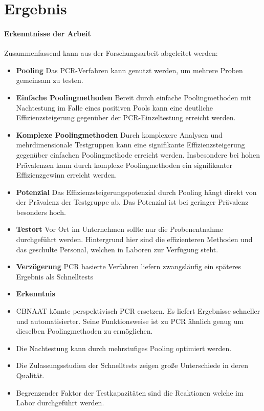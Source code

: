 \chapter{Ergebnis}
\subsubsection{Erkenntnisse der Arbeit}
Zusammenfassend kann aus der Forschungsarbeit abgeleitet werden:

\begin{itemize}
	\item \textbf{Pooling} Das PCR-Verfahren kann genutzt werden, um mehrere Proben gemeinsam zu testen.
	\item \textbf{Einfache Poolingmethoden} Bereit durch einfache Poolingmethoden mit Nachtestung im Falle eines positiven Pools kann eine deutliche Effizienzsteigerung gegenüber der PCR-Einzeltestung erreicht werden.
	\item \textbf{Komplexe Poolingmethoden} Durch komplexere Analysen und mehrdimensionale Testgruppen kann eine signifikante Effizienzsteigerung gegenüber einfachen Poolingmethode erreicht werden. Insbesondere bei hohen Prävalenzen kann durch komplexe Poolingmethoden ein signifikanter Effizienzgewinn erreicht werden.
	\item \textbf{Potenzial} Das Effizienzsteigerungspotenzial durch Pooling hängt direkt von der Prävalenz der Testgruppe ab. Das Potenzial ist bei geringer Prävalenz besonders hoch.
	\item \textbf{Testort} Vor Ort im Unternehmen sollte nur die Probenentnahme durchgeführt werden. Hintergrund hier sind die effizienteren Methoden und das geschulte Personal, welchen in Laboren zur Verfügung steht.
	\item \textbf{Verzögerung} PCR basierte Verfahren liefern zwangsläufig ein späteres Ergebnis als Schnelltests
	\item \textbf{Erkenntnis} 
	\item CBNAAT könnte perspektivisch PCR ersetzen. Es liefert Ergebnisse schneller und automatisierter. Seine Funktionsweise ist zu PCR ähnlich genug um dieselben Poolingmethoden zu ermöglichen.
	\item Die Nachtestung kann durch mehrstufiges Pooling optimiert werden.
	\item Die Zulassungsstudien der Schnelltests zeigen große Unterschiede in deren Qualität.
	\item Begrenzender Faktor der Testkapazitäten sind die Reaktionen welche im Labor durchgeführt werden.

\end{itemize}
